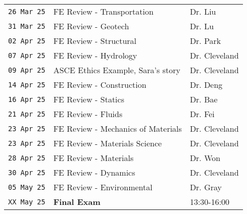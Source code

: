 \documentclass[12pt]{article}
\begin{document}
\begin{table}[ht!]
\begin{tabular}{p{1.0in}p{2.5in}p{3.0in}}
\texttt{26 Mar 25} & FE Review - Transportation & Dr. Liu \cite{NCEES2020}  \cite{Lindeburg2017}\\ %
\texttt{31 Mar 25} & FE Review - Geotech & Dr. Lu \cite{NCEES2020}  \cite{Lindeburg2017}\\ %
\texttt{02 Apr 25} & FE Review - Structural & Dr. Park \cite{NCEES2020} \cite{Lindeburg2017}\\ %
\texttt{07 Apr 25} & FE Review - Hydrology & Dr. Cleveland \cite{NCEES2020} \cite{Lindeburg2017}\\  %
\texttt{09 Apr 25} & ASCE Ethics Example, Sara's story  & Dr. Cleveland \cite{ASCE2019}\\ %
\texttt{14 Apr 25} & FE Review - Construction &  Dr. Deng \cite{NCEES2020}  \cite{Lindeburg2017}\\ %
\texttt{16 Apr 25} & FE Review - Statics  & Dr. Bae \cite{NCEES2020}  \cite{Lindeburg2017}\\ %
\texttt{21 Apr 25} & FE Review - Fluids & Dr. Fei \cite{NCEES2020}  \cite{Lindeburg2017}\\ %
\texttt{23 Apr 25} & FE Review - Mechanics of Materials & Dr. Cleveland \cite{NCEES2020} \cite{Lindeburg2017}\\ %
\texttt{23 Apr 25} & FE Review - Materials Science & Dr. Cleveland \cite{NCEES2020} \cite{Lindeburg2017}\\ %
\texttt{28 Apr 25} & FE Review - Materials & Dr. Won \cite{NCEES2020}  \cite{Lindeburg2017}\\ %
\texttt{30 Apr 25} & FE Review - Dynamics & Dr. Cleveland \cite{NCEES2020}  \cite{Lindeburg2017}\\ %
\texttt{05 May 25} & FE Review - Environmental  & Dr. Gray \cite{NCEES2020}  \cite{Lindeburg2017}\\ %
\texttt{XX May 25} & \textbf{Final Exam} & 13:30-16:00 \\ %
\hline
   \end{tabular}
   \label{tab:fall2013schedule}
\end{table}


\clearpage
\end{document}
